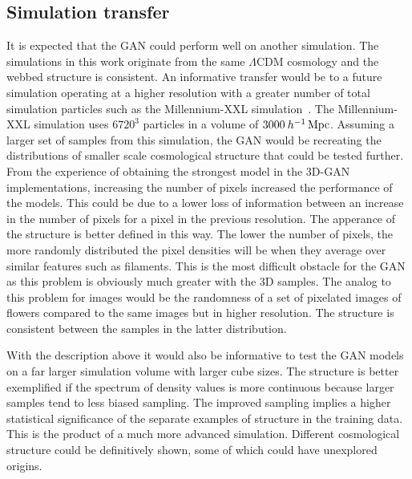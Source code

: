 \documentclass[twocolumn]{article}
\numberwithin{equation}{section}
\begin{document}


\subsection{Simulation transfer}
It is expected that the GAN could perform well on another simulation. The simulations in this work originate from the same 
$\Lambda \text{CDM}$ cosmology and the webbed structure is consistent. An informative transfer would be to a future 
simulation operating at a higher resolution with a greater number of total simulation particles such as the Millennium-XXL 
simulation~\cite{millxxlsim}. The Millennium-XXL simulation uses $6720^3$ particles in a volume of $3000 \: h^{-1} 
\,\textup{Mpc}$. Assuming a larger set of samples from this simulation, the GAN would be recreating the distributions of 
smaller scale cosmological structure that could be tested further. From the experience of obtaining the strongest model in
the 3D-GAN implementations, increasing the number of pixels increased the performance of the models. This could be due to 
a lower loss of information between an increase in the number of pixels for a pixel in the previous resolution. The 
apperance of the structure is better defined in this way. The lower the number of pixels, the more randomly distributed 
the pixel densities will be when they average over similar features such as filaments. This is the most difficult obstacle
for the GAN as this problem is obviously much greater with the 3D samples. The analog to this problem for images would be
the randomness of a set of pixelated images of flowers compared to the same images but in higher resolution. The structure
is consistent between the samples in the latter distribution. 

With the description above it would also be informative to test the GAN models on a far larger simulation volume with 
larger cube sizes. The structure is better exemplified if the spectrum of density values is more continuous because larger
samples tend to less biased sampling. The improved sampling implies a higher statistical significance of the separate 
examples of structure in the training data. This is the product of a much more advanced simulation. Different cosmological
structure could be definitively shown, some of which could have unexplored origins. 
\end{document}
